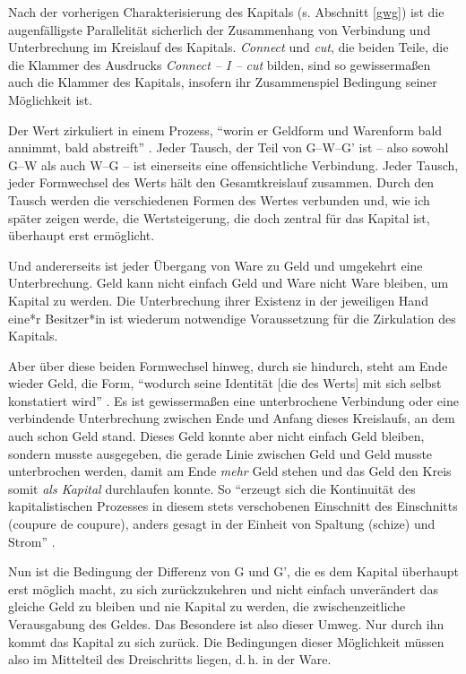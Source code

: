 \documentclass[12pt,
               paper=a4,
               twoside=false,
               onehalfspacing,
               bibliography=totoc,
               toc=graduated,
               ]{scrartcl}
\newcommand{\pc}[2]{\parencite[#1]{#2}}
\newcommand{\gwg}{G--W--G'\xspace}
\newcommand{\cic}{Connect -- I -- cut\xspace}
\begin{document}
Nach der vorherigen Charakterisierung des Kapitals (s. Abschnitt
\ref{gwg}) ist die augenfälligste Parallelität sicherlich der
Zusammenhang von Verbindung und Unterbrechung im Kreislauf des
Kapitals. \emph{Connect} und \emph{cut}, die beiden Teile, die die
Klammer des Ausdrucks \emph{\cic} bilden, sind so gewissermaßen auch
die Klammer des Kapitals, insofern ihr Zusammenspiel Bedingung seiner
Möglichkeit ist.


Der Wert zirkuliert in einem Prozess, "`worin er Geldform und
Warenform bald annimmt, bald abstreift"' \pc{169}{kap}. Jeder Tausch,
der Teil von \gwg ist -- also sowohl G--W als auch W--G -- ist
einerseits eine offensichtliche Verbindung. Jeder Tausch, jeder
Formwechsel des Werts hält den Gesamtkreislauf zusammen. Durch den
Tausch werden die verschiedenen Formen des Wertes verbunden und, wie
ich später zeigen werde, die Wertsteigerung, die doch zentral für das
Kapital ist, überhaupt erst ermöglicht.


Und andererseits ist jeder Übergang von Ware zu Geld und umgekehrt
eine Unterbrechung. Geld kann nicht einfach Geld und Ware nicht Ware
bleiben, um Kapital zu werden. Die Unterbrechung ihrer Existenz in der
jeweiligen Hand eine*r Besitzer*in ist wiederum notwendige
Voraussetzung für die Zirkulation des Kapitals.


Aber über diese beiden Formwechsel hinweg, durch sie hindurch, steht
am Ende wieder Geld, die Form, "`wodurch seine Identität [die des
Werts] mit sich selbst konstatiert wird"' \pc{169}{kap}. Es ist
gewissermaßen eine unterbrochene Verbindung oder eine verbindende
Unterbrechung zwischen Ende und Anfang dieses Kreislaufs, an dem auch
schon Geld stand. Dieses Geld konnte aber nicht einfach Geld bleiben,
sondern musste ausgegeben, die gerade Linie zwischen Geld und Geld
musste unterbrochen werden, damit am Ende \emph{mehr} Geld stehen und
das Geld den Kreis somit \emph{als Kapital} durchlaufen konnte. So
"`erzeugt sich die Kontinuität des kapitalistischen Prozesses in
diesem stets verschobenen Einschnitt des Einschnitts (coupure de
coupure), anders gesagt in der Einheit von Spaltung (schize) und
Strom"' \pc{296}{ao}.


Nun ist die Bedingung der Differenz von G und G', die es dem Kapital
überhaupt erst möglich macht, zu sich zurückzukehren und nicht einfach
unverändert das gleiche Geld zu bleiben und nie Kapital zu werden, die
zwischenzeitliche Verausgabung des Geldes. Das Besondere ist also
dieser Umweg. Nur durch ihn kommt das Kapital zu sich zurück. Die
Bedingungen dieser Möglichkeit müssen also im Mittelteil des
Dreischritts liegen, d.\,h. in der Ware.
\end{document}
